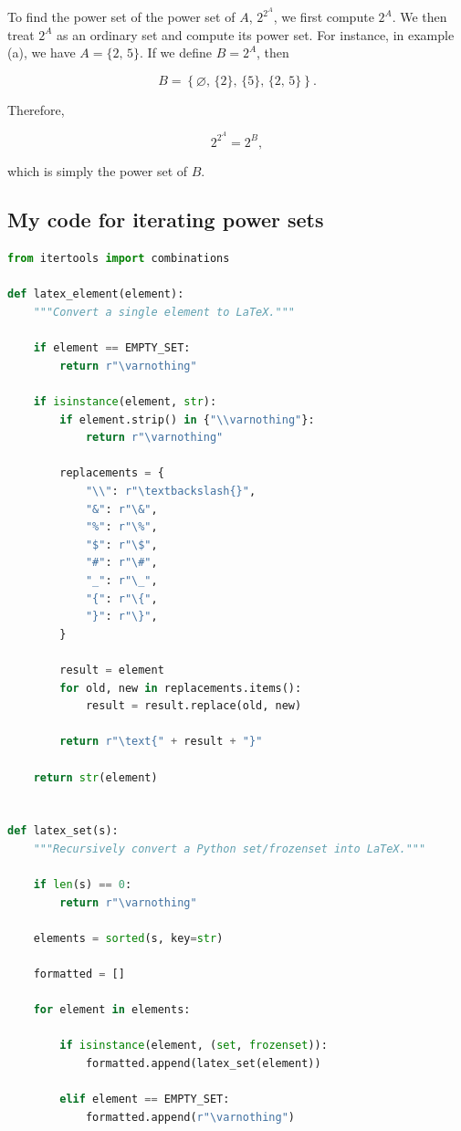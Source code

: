 \documentclass[12pt]{article}
\begin{document}
To find the power set of the power set of $A$, $2^{2^A}$, we first compute
$2^A$. We then treat $2^A$ as an ordinary set and compute its power set.
For instance, in example (a), we have $A = \{2,\,5\}$. If we define
$B = 2^A$, then

\[
B = \left\{
\varnothing,\,
\{2\},\,
\{5\},\,
\{2,\,5\}
\right\}.
\]

Therefore,

\[
2^{2^A} = 2^B,
\]

which is simply the power set of $B$.
\vspace{1cm}
\subsection*{My code for iterating power sets}
\begin{lstlisting}[language=python]
from itertools import combinations

def latex_element(element):
    """Convert a single element to LaTeX."""

    if element == EMPTY_SET:
        return r"\varnothing"

    if isinstance(element, str):
        if element.strip() in {"\\varnothing"}:
            return r"\varnothing"

        replacements = {
            "\\": r"\textbackslash{}",
            "&": r"\&",
            "%": r"\%",
            "$": r"\$",
            "#": r"\#",
            "_": r"\_",
            "{": r"\{",
            "}": r"\}",
        }

        result = element
        for old, new in replacements.items():
            result = result.replace(old, new)

        return r"\text{" + result + "}"

    return str(element)


def latex_set(s):
    """Recursively convert a Python set/frozenset into LaTeX."""

    if len(s) == 0:
        return r"\varnothing"

    elements = sorted(s, key=str)

    formatted = []

    for element in elements:

        if isinstance(element, (set, frozenset)):
            formatted.append(latex_set(element))

        elif element == EMPTY_SET:
            formatted.append(r"\varnothing")


\end{lstlisting}
\end{document}
